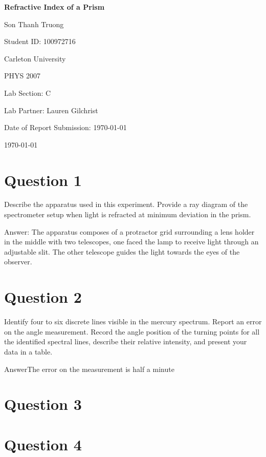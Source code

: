 \documentclass[12pt,letterpaper]{article}
\begin{document}
\begin{titlepage}
    \centering
    \vspace*{3cm}

    {\Huge\bfseries Refractive Index of a Prism\par}

    \vspace{2cm}

    {\Large Son Thanh Truong\par}
    {\Large Student ID: 100972716\par}
    \vspace{0.5cm}
    {\large Carleton University\par}
    {\large PHYS 2007\par}
    {\large Lab Section: C\par}
    {\large Lab Partner: Lauren Gilchrist\par}
    {\large Date of Report Submission: \today\par}
    
    
    \vfill

    {\large \today\par}
\end{titlepage}




\section{Question 1}

Describe the apparatus used in this experiment. Provide a ray diagram of the
spectrometer setup when light is refracted at minimum deviation in the prism.

Answer: The apparatus composes of a protractor grid surrounding a lens holder in the middle
with two telescopes, one faced the lamp to receive light through an adjustable slit.
The other telescope guides the light towards the eyes of the observer.

\section{Question 2}

Identify four to six discrete lines visible in the mercury spectrum. Report an error on
the angle measurement. Record the angle position of the turning points for all the
identified spectral lines, describe their relative intensity, and present your data in a
table.

AnswerThe error on the measurement is half a minute

\section{Question 3}



\section{Question 4}





\end{document}
